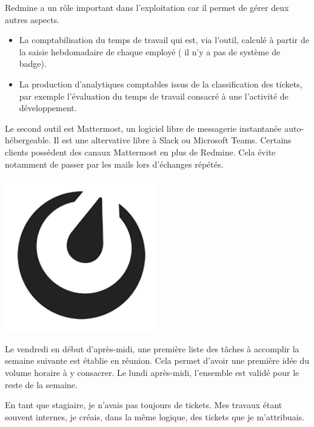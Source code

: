 \documentclass[12pt, a4paper, twoside]{article}
\begin{document}
\gls{Redmine} a un rôle important dans l'exploitation car il permet de gérer deux autres aspects.
\begin{itemize}
    \item La comptabilisation du temps de travail qui est, via l'outil, calculé à partir de la saisie hebdomadaire de chaque employé ( il n'y a pas de système de badge).
    \item La production d'analytiques comptables issus de la classification des tickets, par exemple l'évaluation du temps de travail consacré à une l'activité de développement.
\end{itemize}

\noindent%
\begin{minipage}{.7\textwidth}%
Le second outil est Mattermost, un logiciel libre de messagerie instantanée auto-hébergeable.
Il est une altervative libre à \gls{Slack} ou \gls{Microsoft Teams}.
Certains clients possèdent des canaux Mattermost en plus de \gls{Redmine}.
Cela évite notamment de passer par les mails lors d'échanges répétés. \\
\end{minipage}%
\hfill
\begin{minipage}{.3\textwidth}%
\begin{center}
\includegraphics[width=0.5\textwidth]{src/logo_mattermost.png}
\end{center}
\end{minipage}%

Le vendredi en début d'après-midi, une première liste des tâches à accomplir la semaine suivante est établie en réunion.
Cela permet d'avoir une première idée du volume horaire à y consacrer.
Le lundi après-midi, l'ensemble est validé pour le reste de la semaine.

En tant que stagiaire, je n'avais pas toujours de tickets.
Mes travaux étant souvent internes, je créais, dans la même logique, des tickets que je m'attribuais.
\end{document}
